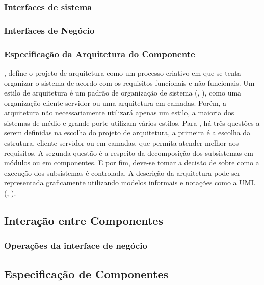 \subsubsection{Interfaces de sistema}

\subsubsection{Interfaces de Negócio}

\subsubsection{Especificação da Arquitetura do Componente}

\cite{sommerville:2013}, define o projeto de arquitetura como um processo criativo em que se tenta organizar o sistema de acordo com os requisitos funcionais e não funcionais. Um estilo de arquitetura é um padrão de organização de sistema (\cite{shaw:1996}, \cite{sommerville:2013}), como uma organização cliente-servidor ou uma arquitetura em camadas. Porém, a arquitetura não necessariamente utilizará apenas um estilo, a maioria dos sistemas de médio e grande porte utilizam vários estilos. Para \cite{shaw:1996}, há três questões a serem definidas na escolha do projeto de arquitetura, a primeira é a escolha da estrutura, cliente-servidor ou em camadas, que permita atender melhor aos requisitos. A segunda questão é a respeito da decomposição dos subsistemas em módulos ou em componentes. E por fim, deve-se tomar a decisão de sobre como a execução dos subsistemas é controlada. A descrição da arquitetura pode ser representada graficamente utilizando modelos informais e notações como a UML (\cite{clements:2002}, \cite{sommerville:2013}).


\subsection{Interação entre Componentes}

\subsubsection{Operações da interface de negócio}


\subsection{Especificação de Componentes}



